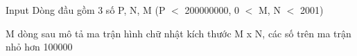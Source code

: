 Input
Dòng đầu gồm 3 số P, N, M (P $<$ 200000000, 0 $<$ M, N $<$ 2001)   


   M dòng sau mô tả ma trận hình chữ nhật kích thước M x N, các số trên ma trận nhỏ hơn 100000